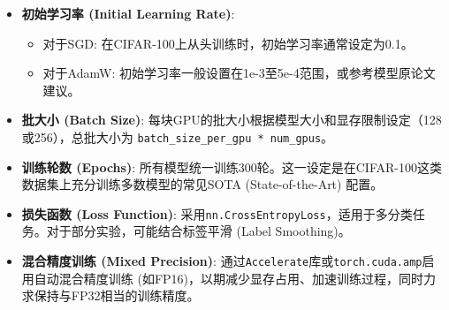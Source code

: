 \documentclass[a4paper]{article}
\begin{document}
\begin{description}
\begin{itemize}
\begin{itemize}
    \end{itemize}
    \item \textbf{初始学习率 (Initial Learning Rate)}:
    \begin{itemize}
        \item 对于SGD: 在CIFAR-100上从头训练时，初始学习率通常设定为0.1。
        \item 对于AdamW: 初始学习率一般设置在1e-3至5e-4范围，或参考模型原论文建议。
    \end{itemize}
    \item \textbf{批大小 (Batch Size)}: 每块GPU的批大小根据模型大小和显存限制设定（128或256），总批大小为 \texttt{batch\_size\_per\_gpu * num\_gpus}。
    \item \textbf{训练轮数 (Epochs)}: 所有模型统一训练300轮。这一设定是在CIFAR-100这类数据集上充分训练多数模型的常见SOTA (State-of-the-Art) 配置。
    \item \textbf{损失函数 (Loss Function)}: 采用\texttt{nn.CrossEntropyLoss}，适用于多分类任务。对于部分实验，可能结合标签平滑 (Label Smoothing)。
    \item \textbf{混合精度训练 (Mixed Precision)}: 通过\texttt{Accelerate}库或\texttt{torch.cuda.amp}启用自动混合精度训练 (如FP16)，以期减少显存占用、加速训练过程，同时力求保持与FP32相当的训练精度。
\end{itemize}


\end{description}
\end{document}
